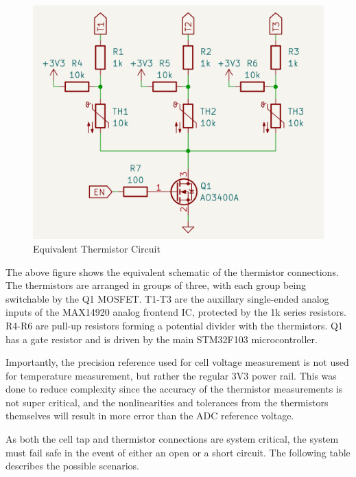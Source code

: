 \documentclass[12pt]{article}
\begin{document}
\begin{figure}[H]
  \centering
  \includegraphics[width=\linewidth]{thermistor.png}
  \caption{Equivalent Thermistor Circuit}
  \label{fig:bms-thermistor-circuit}
\end{figure}

The above figure shows the equivalent schematic of the thermistor connections.
The thermistors are arranged in groups of three, with each group being switchable by the Q1 MOSFET.
T1-T3 are the auxillary single-ended analog inputs of the MAX14920 analog frontend IC, protected by the 1k series resistors.
R4-R6 are pull-up resistors forming a potential divider with the thermistors.
Q1 has a gate resistor and is driven by the main STM32F103 microcontroller.

Importantly, the precision reference used for cell voltage measurement is not used for temperature measurement, but rather the regular 3V3 power rail.
This was done to reduce complexity since the accuracy of the thermistor measurements is not super critical, and the nonlinearities and tolerances from the thermistors themselves will result in more error than the ADC reference voltage.

As both the cell tap and thermistor connections are system critical, the system must fail safe in the event of either an open or a short circuit.
The following table describes the possible scenarios.
\end{document}
